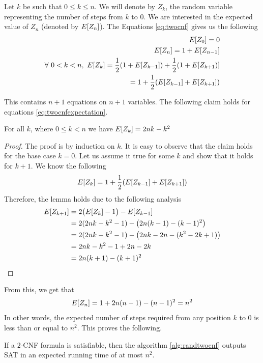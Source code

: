 Let $k$ be such that $0 \leq k \leq n$. We will denote by $Z_k$, the random variable representing the number of steps from $k$ to $0$. We are interested in the expected value of $Z_n$ (denoted by 
 $E[Z_n]$). The Equations \ref{eq:twocnf} gives us the following
\begin{equation}
\label{eq:twocnfexpectation}
\begin{split}
E[Z_0] = 0 \\
E[Z_n] = 1 + E[Z_{n-1}] \\
 \forall ~0<k<n, ~E[Z_k] = \frac{1}{2} (1+E[Z_{k-1}]) + \frac{1}{2}(1+E[Z_{k+1})] \\
  = 1 + \frac{1}{2} (E[Z_{k-1}] + E[Z_{k+1}]) 
\end{split}
\end{equation} 

This contains $n+1$ equations on $n+1$ variables. The following claim holds for equations \ref{eq:twocnfexpectation}.
\begin{lemma}
For all $k$, where $0\leq k < n$ we have $E[Z_k] = 2nk-k^2$
\end{lemma}
\begin{proof}
The proof is by induction on $k$. It is easy to observe that the claim holds for the base case $k=0$. Let us assume it true for some $k$ and show that it holds for $k+1$. We know the following
\[
E[Z_k] = 1 + \frac{1}{2} (E[Z_{k-1}] + E[Z_{k+1}]) 
\]
Therefore, the lemma holds due to the following analysis
\begin{align*}
E[Z_{k+1}] & = 2 \big(E[Z_k] - 1 \big) - E[Z_{k-1}] \\
& = 2 (2nk- k^2 -1 ) -  \big( 2n (k-1) - (k-1)^2 \big)  \\
& = 2 (2nk - k^2 -1 ) - \big( 2nk - 2n - (k^2 -2k + 1) \big) \\
& = 2nk - k^2 -1 + 2n - 2k \\
& = 2n(k+1) - (k+1)^2 
\end{align*}
\end{proof}

From this, we get that 
\[
E[Z_n] = 1 + 2n (n-1) - (n-1)^2 = n^2
\]
In other words, the expected number of steps required from any position $k$ to $0$ is less than or equal to $n^2$. This proves the following.
\begin{lemma}
If a $2$-CNF formula is satisfiable, then the algorithm \ref{alg:randtwocnf} outputs SAT in an expected running time of at most $n^2$. 
\end{lemma}

